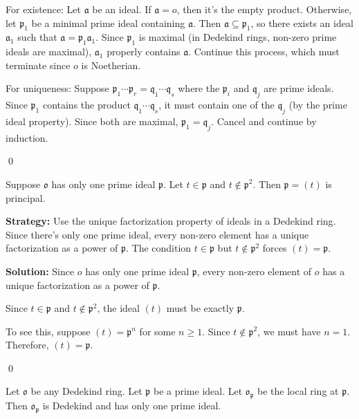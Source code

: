 For existence: Let $\mathfrak{a}$ be an ideal. If $\mathfrak{a} = o$, then it's the empty product. Otherwise, let $\mathfrak{p}_1$ be a minimal prime ideal containing $\mathfrak{a}$. Then $\mathfrak{a} \subseteq \mathfrak{p}_1$, so there exists an ideal $\mathfrak{a}_1$ such that $\mathfrak{a} = \mathfrak{p}_1 \mathfrak{a}_1$. Since $\mathfrak{p}_1$ is maximal (in Dedekind rings, non-zero prime ideals are maximal), $\mathfrak{a}_1$ properly contains $\mathfrak{a}$. Continue this process, which must terminate since $o$ is Noetherian.

For uniqueness: Suppose $\mathfrak{p}_1 \cdots \mathfrak{p}_r = \mathfrak{q}_1 \cdots \mathfrak{q}_s$ where the $\mathfrak{p}_i$ and $\mathfrak{q}_j$ are prime ideals. Since $\mathfrak{p}_1$ contains the product $\mathfrak{q}_1 \cdots \mathfrak{q}_s$, it must contain one of the $\mathfrak{q}_j$ (by the prime ideal property). Since both are maximal, $\mathfrak{p}_1 = \mathfrak{q}_j$. Cancel and continue by induction.


\qed
\begin{problembox}
Suppose $\mathfrak{o}$ has only one prime ideal $\mathfrak{p}$. Let $t \in \mathfrak{p}$ and $t \notin \mathfrak{p}^2$. Then $\mathfrak{p} = (t)$ is principal.
\end{problembox}

\noindent\textbf{Strategy:} Use the unique factorization property of ideals in a Dedekind ring. Since there's only one prime ideal, every non-zero element has a unique factorization as a power of $\mathfrak{p}$. The condition $t \in \mathfrak{p}$ but $t \notin \mathfrak{p}^2$ forces $(t) = \mathfrak{p}$.

\noindent\textbf{Solution:}
Since $o$ has only one prime ideal $\mathfrak{p}$, every non-zero element of $o$ has a unique factorization as a power of $\mathfrak{p}$.

Since $t \in \mathfrak{p}$ and $t \notin \mathfrak{p}^2$, the ideal $(t)$ must be exactly $\mathfrak{p}$.

To see this, suppose $(t) = \mathfrak{p}^n$ for some $n \geq 1$. Since $t \notin \mathfrak{p}^2$, we must have $n = 1$. Therefore, $(t) = \mathfrak{p}$.


\qed
\begin{problembox}
Let $\mathfrak{o}$ be any Dedekind ring. Let $\mathfrak{p}$ be a prime ideal. Let $\mathfrak{o}_{\mathfrak{p}}$ be the local ring at $\mathfrak{p}$. Then $\mathfrak{o}_{\mathfrak{p}}$ is Dedekind and has only one prime ideal.
\end{problembox}

